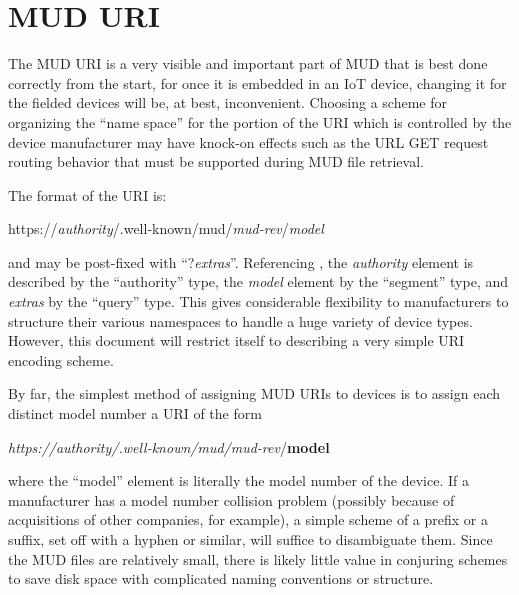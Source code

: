 \documentclass[conference]{IEEEtran}
\begin{document}
\section{MUD URI}

The MUD URI is a very visible and important part of MUD that is best
done correctly from the start, for once it is embedded in an IoT
device, changing it for the fielded devices will be, at best,
inconvenient.  Choosing a scheme for organizing the ``name space'' for
the portion of the URI which is controlled by the device manufacturer
may have knock-on effects such as the URL GET request routing behavior
that must be supported during MUD file retrieval.

The format of the URI is:

\begin{center}
  \ttfamily\scriptsize
  https://{\em authority}/.well-known/mud/{\em mud-rev}/{\em model}
\end{center}
and may be post-fixed with ``{\ttfamily\small ?{\em extras}}''.
Referencing \cite{ietf:rfc3986}, the {\em authority} element is
described by the ``authority'' type, the {\em model} element by the
``segment'' type, and {\em extras} by the ``query'' type.  This gives
considerable flexibility to manufacturers to structure their various
namespaces to handle a huge variety of device types.  However, this
document will restrict itself to describing a very simple URI encoding
scheme.

By far, the simplest method of assigning MUD URIs to devices is to
assign each distinct model number a URI of the form

\begin{center}
  \ttfamily\scriptsize
  {\em https://authority/.well-known/mud/mud-rev}/{\bf model}
\end{center}
where the ``model'' element is literally the model number of the
device.  If a manufacturer has a model number collision problem
(possibly because of acquisitions of other companies, for example), a
simple scheme of a prefix or a suffix, set off with a hyphen or
similar, will suffice to disambiguate them.  Since the MUD files are
relatively small, there is likely little value in conjuring schemes to
save disk space with complicated naming conventions or structure.
\end{document}

